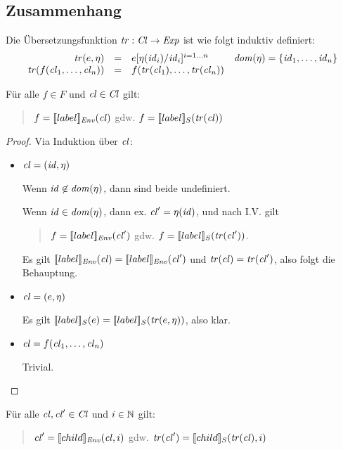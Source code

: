 \documentclass[%
  12pt,%
  a4paper,%
]{article}
\begin{document}
\subsection*{Zusammenhang}

Die \"Ubersetzungsfunktion $\mathit{tr}:\mathit{Cl}\to\mathit{Exp}$ ist wie folgt induktiv definiert:
\[\begin{array}{rcll}
  \mathit{tr}(e,\eta)
  &=& e[\eta(\mathit{id}_i)/\mathit{id}_i]^{i=1 \ldots n}
  & \mathit{dom}(\eta) = \{\mathit{id}_1,\ldots,\mathit{id}_n\}
  \\
  \mathit{tr}(f(\mathit{cl}_1,\ldots,\mathit{cl}_n))
  &=& f(\mathit{tr}(\mathit{cl}_1),\ldots,\mathit{tr}(\mathit{cl}_n))
\end{array}\]

\begin{lemma}
  F\"ur alle $f \in F$ und $\mathit{cl} \in \mathit{Cl}$ gilt:
  \begin{quote}
  $f = [\![label]\!]_{\mathit{Env}}(\mathit{cl})$ gdw. $f = [\![label]\!]_S(\mathit{tr}(\mathit{cl}))$
  \end{quote}
\end{lemma}

\begin{proof}
  Via Induktion \"uber $\mathit{cl}$:
  \begin{itemize}
  \item $\mathit{cl} = (\mathit{id},\eta)$

    Wenn $\mathit{id} \not\in \mathit{dom}(\eta)$, dann sind beide undefiniert.

    Wenn $\mathit{id} \in \mathit{dom}(\eta)$, dann ex. $\mathit{cl}' = \eta(\mathit{id})$, und nach I.V. gilt
    \begin{quote}
      $f = [\![label]\!]_{\mathit{Env}}(\mathit{cl}')$ gdw. $f = [\![label]\!]_S(\mathit{tr}(\mathit{cl}'))$.
    \end{quote}
    Es gilt $[\![label]\!]_{\mathit{Env}}(\mathit{cl}) = [\![label]\!]_{\mathit{Env}}(\mathit{cl}')$ und
    $\mathit{tr}(\mathit{cl}) = \mathit{tr}(\mathit{cl}')$, also folgt die Behauptung.

  \item $\mathit{cl} = (e,\eta)$

    Es gilt $[\![label]\!]_S(e) = [\![label]\!]_S(\mathit{tr}(e,\eta))$, also klar.

  \item $\mathit{cl} = f(\mathit{cl}_1,\ldots,\mathit{cl}_n)$

    Trivial.

  \end{itemize}
\end{proof}

\begin{lemma}
  F\"ur alle $\mathit{cl},\mathit{cl}' \in \mathit{Cl}$ und $i \in \mathbb N$ gilt:
  \begin{quote}
    $\mathit{cl}' = [\![child]\!]_{\mathit{Env}}(\mathit{cl},i)$ gdw. $\mathit{tr}(\mathit{cl}') = [\![child]\!]_S(\mathit{tr}(\mathit{cl}),i)$
  \end{quote}
\end{lemma}
\end{document}
